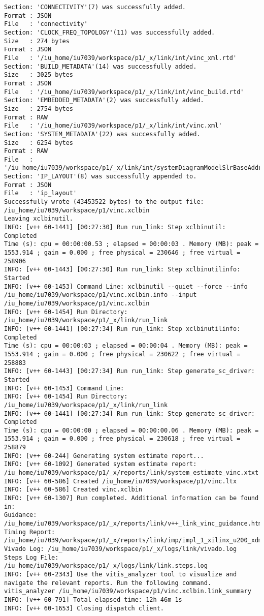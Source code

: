 \begin{lstlisting}[label=lst:lev_rec,caption=Содержимое log-файла]
Section: 'CONNECTIVITY'(7) was successfully added.
Format : JSON
File   : 'connectivity'
Section: 'CLOCK_FREQ_TOPOLOGY'(11) was successfully added.
Size   : 274 bytes
Format : JSON
File   : '/iu_home/iu7039/workspace/p1/_x/link/int/vinc_xml.rtd'
Section: 'BUILD_METADATA'(14) was successfully added.
Size   : 3025 bytes
Format : JSON
File   : '/iu_home/iu7039/workspace/p1/_x/link/int/vinc_build.rtd'
Section: 'EMBEDDED_METADATA'(2) was successfully added.
Size   : 2754 bytes
Format : RAW
File   : '/iu_home/iu7039/workspace/p1/_x/link/int/vinc.xml'
Section: 'SYSTEM_METADATA'(22) was successfully added.
Size   : 6254 bytes
Format : RAW
File   : '/iu_home/iu7039/workspace/p1/_x/link/int/systemDiagramModelSlrBaseAddress.json'
Section: 'IP_LAYOUT'(8) was successfully appended to.
Format : JSON
File   : 'ip_layout'
Successfully wrote (43453522 bytes) to the output file: /iu_home/iu7039/workspace/p1/vinc.xclbin
Leaving xclbinutil.
INFO: [v++ 60-1441] [00:27:30] Run run_link: Step xclbinutil: Completed
Time (s): cpu = 00:00:00.53 ; elapsed = 00:00:03 . Memory (MB): peak = 1553.914 ; gain = 0.000 ; free physical = 230646 ; free virtual = 258906
INFO: [v++ 60-1443] [00:27:30] Run run_link: Step xclbinutilinfo: Started
INFO: [v++ 60-1453] Command Line: xclbinutil --quiet --force --info /iu_home/iu7039/workspace/p1/vinc.xclbin.info --input /iu_home/iu7039/workspace/p1/vinc.xclbin
INFO: [v++ 60-1454] Run Directory: /iu_home/iu7039/workspace/p1/_x/link/run_link
INFO: [v++ 60-1441] [00:27:34] Run run_link: Step xclbinutilinfo: Completed
Time (s): cpu = 00:00:03 ; elapsed = 00:00:04 . Memory (MB): peak = 1553.914 ; gain = 0.000 ; free physical = 230622 ; free virtual = 258883
INFO: [v++ 60-1443] [00:27:34] Run run_link: Step generate_sc_driver: Started
INFO: [v++ 60-1453] Command Line: 
INFO: [v++ 60-1454] Run Directory: /iu_home/iu7039/workspace/p1/_x/link/run_link
INFO: [v++ 60-1441] [00:27:34] Run run_link: Step generate_sc_driver: Completed
Time (s): cpu = 00:00:00 ; elapsed = 00:00:00.06 . Memory (MB): peak = 1553.914 ; gain = 0.000 ; free physical = 230618 ; free virtual = 258879
INFO: [v++ 60-244] Generating system estimate report...
INFO: [v++ 60-1092] Generated system estimate report: /iu_home/iu7039/workspace/p1/_x/reports/link/system_estimate_vinc.xtxt
INFO: [v++ 60-586] Created /iu_home/iu7039/workspace/p1/vinc.ltx
INFO: [v++ 60-586] Created vinc.xclbin
INFO: [v++ 60-1307] Run completed. Additional information can be found in:
Guidance: /iu_home/iu7039/workspace/p1/_x/reports/link/v++_link_vinc_guidance.html
Timing Report: /iu_home/iu7039/workspace/p1/_x/reports/link/imp/impl_1_xilinx_u200_xdma_201830_2_bb_locked_timing_summary_routed.rpt
Vivado Log: /iu_home/iu7039/workspace/p1/_x/logs/link/vivado.log
Steps Log File: /iu_home/iu7039/workspace/p1/_x/logs/link/link.steps.log
INFO: [v++ 60-2343] Use the vitis_analyzer tool to visualize and navigate the relevant reports. Run the following command. 
vitis_analyzer /iu_home/iu7039/workspace/p1/vinc.xclbin.link_summary 
INFO: [v++ 60-791] Total elapsed time: 12h 46m 1s
INFO: [v++ 60-1653] Closing dispatch client.
\end{lstlisting}


